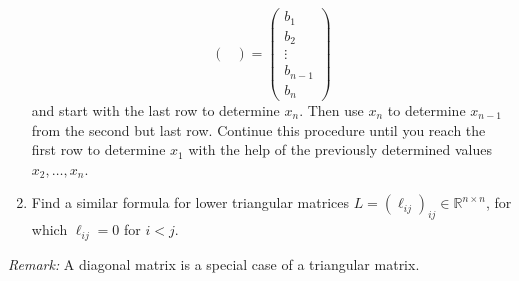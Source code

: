 \begin{enumerate}
{$$\begin{pmatrix}
	\end{pmatrix} = \begin{pmatrix}
	b_1 \\b_2\\\vdots\\ b_{n-1}\\b_n
	\end{pmatrix}$$
	and start with the last row to determine $x_n$. Then use $x_n$ to determine $x_{n-1}$ from the second but last row. Continue this procedure until you reach the first row to determine $x_1$ with the help of the previously determined values $x_2, \ldots, x_n$.}
		\item Find a similar formula for lower triangular matrices $L = (\ell_{ij})_{ij} \in \mathbb{R}^{n \times n}$, for which $\ell_{ij} = 0$ for $i < j$.
\end{enumerate}
\textit{Remark:} A diagonal matrix is a special case of a triangular matrix.